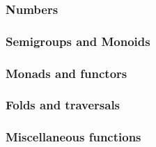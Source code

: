 %

\subsubsection{Numbers}


\subsubsection{Semigroups and Monoids}

\subsubsection{Monads and functors}

\subsubsection{Folds and traversals}

\subsubsection{Miscellaneous functions}

%